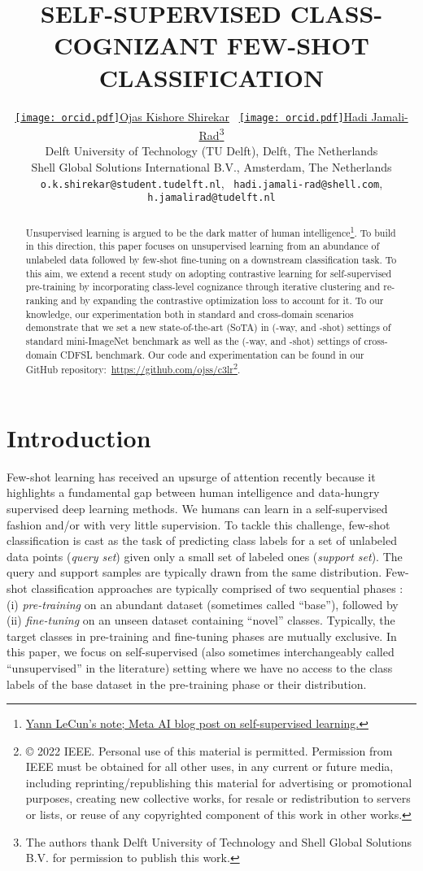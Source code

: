 \documentclass{article}
\title{SELF-SUPERVISED CLASS-COGNIZANT FEW-SHOT CLASSIFICATION}
\author{\href{https://orcid.org/0000-0002-5123-5809}{\texttt{[image: orcid.pdf]}\hspace{1mm}Ojas Kishore Shirekar} \quad~\href{https://orcid.org/0000-0003-2254-6963 }{\texttt{[image: orcid.pdf]}\hspace{1mm}Hadi Jamali-Rad}\thanks{The authors thank Delft University of Technology and Shell Global Solutions B.V. for permission to publish this work.}\\
{\textsuperscript{}Delft University of Technology (TU Delft), Delft, The Netherlands} \\{\textsuperscript{}Shell Global Solutions International B.V., Amsterdam, The Netherlands}\\ \small{\texttt{o.k.shirekar@student.tudelft.nl}},~
\small{\texttt{hadi.jamali-rad@shell.com}},\\
\small{\texttt{h.jamalirad@tudelft.nl}}}
\begin{document}
\maketitle
\begin{abstract}
Unsupervised learning is argued to be the dark matter of human intelligence\footnote{\href{https://ai.facebook.com/blog/self-supervised-learning-the-dark-matter-of-intelligence/}{Yann LeCun's note; Meta AI blog post on self-supervised learning.}}. To build in this direction, this paper focuses on unsupervised learning from an abundance of unlabeled data followed by few-shot fine-tuning on a downstream classification task. To this aim, we extend a recent study on adopting contrastive learning for self-supervised pre-training by incorporating class-level cognizance through iterative clustering and re-ranking and by expanding the contrastive optimization loss to account for it. To our knowledge, our experimentation both in standard and cross-domain scenarios demonstrate that we set a new state-of-the-art (SoTA) in (-way,  and -shot) settings of standard mini-ImageNet benchmark as well as the (-way,  and -shot) settings of cross-domain CDFSL benchmark. Our code and experimentation can be found in our GitHub repository:\, \href{https://github.com/ojss/c3lr}{https://github.com/ojss/c3lr}\footnote{© 2022 IEEE. Personal use of this material is permitted. Permission from IEEE must be obtained for all other uses, in any current or future media, including reprinting/republishing this material for advertising or promotional purposes, creating new collective works, for resale or redistribution to servers or lists, or reuse of any copyrighted component of this work in other works.}. 

\end{abstract}
\section{Introduction}
\label{sec:intro}


Few-shot learning has received an upsurge of attention recently because it highlights a fundamental gap between human intelligence and data-hungry supervised deep learning methods. We humans can learn in a self-supervised fashion and/or with very little supervision. To tackle this challenge, few-shot classification is cast as the task of predicting class labels for a set of unlabeled data points (\textit{query set}) given only a small set of labeled ones (\textit{support set}). The query and support samples are typically drawn from the same distribution. Few-shot classification approaches are typically comprised of two sequential phases \citep{Medina2020Self-SupervisedClassification, chen2020simple, Ji2019UnsupervisedTraining, ye2020few}: (i) \emph{pre-training} on an abundant dataset (sometimes called ``base''), followed by (ii) \emph{fine-tuning} on an unseen dataset containing ``novel'' classes. Typically, the target classes in pre-training and fine-tuning phases are mutually exclusive. In this paper, we focus on self-supervised (also sometimes interchangeably called ``unsupervised'' in the literature) setting where we have no access to the class labels of the base dataset in the pre-training phase or their distribution. 
\end{document}
